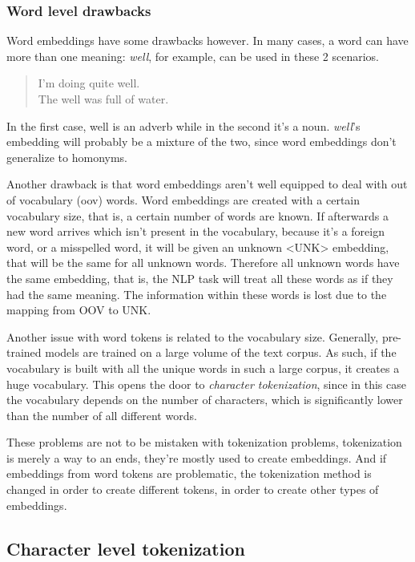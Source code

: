 \subsubsection{Word level drawbacks}

Word embeddings have some drawbacks however. In many cases, a word can have more than one meaning: \emph{well}, for example, can be used in these 2 scenarios.

\begin{quote}
    I'm doing quite well.\\
    The well was full of water.
\end{quote}

In the first case, well is an adverb while in the second it's a noun. \emph{well}'s embedding will probably be a mixture of the two, since word embeddings don't generalize to homonyms.

Another drawback is that word embeddings aren't well equipped to deal with out of vocabulary (oov) words. Word embeddings are created with a certain vocabulary size, that is, a certain number of words are known. If afterwards a new word arrives which isn't present in the vocabulary, because it's a foreign word, or a misspelled word, it will be given an unknown <UNK> embedding, that will be the same for all unknown words. Therefore all unknown words have the same embedding, that is, the NLP task will treat all these words as if they had the same meaning. The information within these words is lost due to the mapping from OOV to UNK.

Another issue with word tokens is related to the vocabulary size. Generally, pre-trained models are trained on a large volume of the text corpus. As such, if the vocabulary is built with all the unique words in such a large corpus, it creates a huge vocabulary. This opens the door to \emph{character tokenization}, since in this case the vocabulary depends on the number of characters, which is significantly lower than the number of all different words.

These problems are not to be mistaken with tokenization problems, tokenization is merely a way to an ends, they're mostly used to create embeddings. And if embeddings from word tokens are problematic, the tokenization method is changed in order to create different tokens, in order to create other types of embeddings.
    
\subsection{Character level tokenization}

